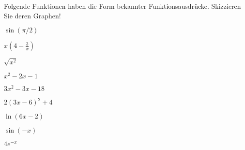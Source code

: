 \item Folgende Funktionen haben die Form bekannter Funktionsausdrücke. Skizzieren Sie deren Graphen!
\begin{enumerate}
\begin{multicols}{3}
\item $\sin(\pi/2)$
\item $x\left(4-\frac{3}{x}\right)$ 
\item $\sqrt{x^2}$
\item $x^2-2x-1$
\item $3x^2-3x-18$
\item $2(3x-6)^2+4$
\item $\ln(6x-2)$
\item $\sin(-x)$
\item $4e^{-x}$
\end{multicols}
\end{enumerate}
